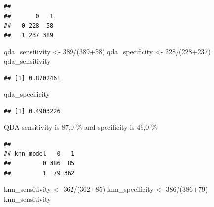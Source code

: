 \documentclass[
]{article}
\newenvironment{Shaded}{\begin{snugshade}}{\end{snugshade}}
\newcommand{\CommentTok}[1]{\textcolor[rgb]{0.56,0.35,0.01}{\textit{#1}}}
\newcommand{\DecValTok}[1]{\textcolor[rgb]{0.00,0.00,0.81}{#1}}
\newcommand{\FunctionTok}[1]{\textcolor[rgb]{0.00,0.00,0.00}{#1}}
\newcommand{\NormalTok}[1]{#1}
\newcommand{\OtherTok}[1]{\textcolor[rgb]{0.56,0.35,0.01}{#1}}
\newcommand{\SpecialCharTok}[1]{\textcolor[rgb]{0.00,0.00,0.00}{#1}}
\begin{document}
\begin{verbatim}
##    
##       0   1
##   0 228  58
##   1 237 389
\end{verbatim}

\begin{Shaded}
\begin{Highlighting}[]
\NormalTok{qda\_sensitivity }\OtherTok{\textless{}{-}} \DecValTok{389}\SpecialCharTok{/}\NormalTok{(}\DecValTok{389}\SpecialCharTok{+}\DecValTok{58}\NormalTok{)}
\NormalTok{qda\_specificity }\OtherTok{\textless{}{-}} \DecValTok{228}\SpecialCharTok{/}\NormalTok{(}\DecValTok{228}\SpecialCharTok{+}\DecValTok{237}\NormalTok{)}
\NormalTok{qda\_sensitivity}
\end{Highlighting}
\end{Shaded}

\begin{verbatim}
## [1] 0.8702461
\end{verbatim}

\begin{Shaded}
\begin{Highlighting}[]
\NormalTok{qda\_specificity}
\end{Highlighting}
\end{Shaded}

\begin{verbatim}
## [1] 0.4903226
\end{verbatim}

QDA sensitivity is 87,0 \% and specificity is 49,0 \%

\begin{Shaded}
\end{Shaded}

\begin{verbatim}
##          
## knn_model   0   1
##         0 386  85
##         1  79 362
\end{verbatim}

\begin{Shaded}
\begin{Highlighting}[]
\NormalTok{knn\_sensitivity }\OtherTok{\textless{}{-}} \DecValTok{362}\SpecialCharTok{/}\NormalTok{(}\DecValTok{362}\SpecialCharTok{+}\DecValTok{85}\NormalTok{)}
\NormalTok{knn\_specificity }\OtherTok{\textless{}{-}} \DecValTok{386}\SpecialCharTok{/}\NormalTok{(}\DecValTok{386}\SpecialCharTok{+}\DecValTok{79}\NormalTok{)}
\NormalTok{knn\_sensitivity}
\end{Highlighting}
\end{Shaded}
\end{document}
